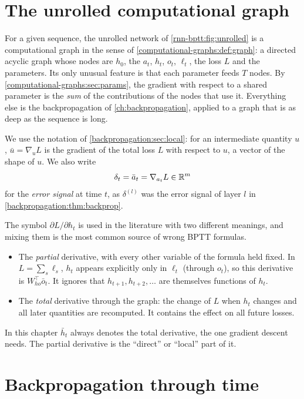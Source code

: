 \begin{notechapter}
\section{The unrolled computational graph}\label{rnn-bptt:sec:graph}

For a given sequence, the unrolled network of \cref{rnn-bptt:fig:unrolled} is a
computational graph in the sense of \cref{computational-graphs:def:graph}: a directed
acyclic graph whose nodes are $h_0$, the $a_t$, $h_t$, $o_t$, $\ell_t$, the loss $L$ and the
parameters. Its only unusual feature is that each parameter feeds $T$ nodes. By
\cref{computational-graphs:sec:params}, the gradient with respect to a shared parameter is
the \emph{sum} of the contributions of the nodes that use it. Everything else is the
backpropagation of \cref{ch:backpropagation}, applied to a graph that is as deep as the
sequence is long.

We use the notation of \cref{backpropagation:sec:local}: for an intermediate quantity
$u$, $\bar u = \nabla_uL$ is the gradient of the total loss $L$ with respect to $u$, a vector of the
shape of $u$. We also write
\[
  \delta_t = \bar a_t = \nabla_{a_t}L\in\mathbb{R}^m
\]
for the \emph{error signal} at time $t$, as $\delta^{(l)}$ was the error signal of layer $l$ in
\cref{backpropagation:thm:backprop}.

\begin{pitfall}
The symbol $\partial L/\partial h_t$ is used in the literature with two different meanings, and mixing them
is the most common source of wrong BPTT formulas.
\begin{itemize}[nosep]
  \item The \emph{partial} derivative, with every other variable of the formula held fixed.
        In $L = \sum_s\ell_s$, $h_t$ appears explicitly only in $\ell_t$ (through $o_t$), so this
        derivative is $W_{ho}^\top\bar o_t$. It ignores that $h_{t+1},h_{t+2},\dots$ are themselves functions of $h_t$.
  \item The \emph{total} derivative through the graph: the change of $L$ when $h_t$ changes and
        all later quantities are recomputed. It contains the effect on all future losses.
\end{itemize}
In this chapter $\bar h_t$ always denotes the total derivative, the one gradient descent needs.
The partial derivative is the ``direct'' or ``local'' part of it.
\end{pitfall}

\section{Backpropagation through time}\label{rnn-bptt:sec:bptt}


\end{notechapter}
